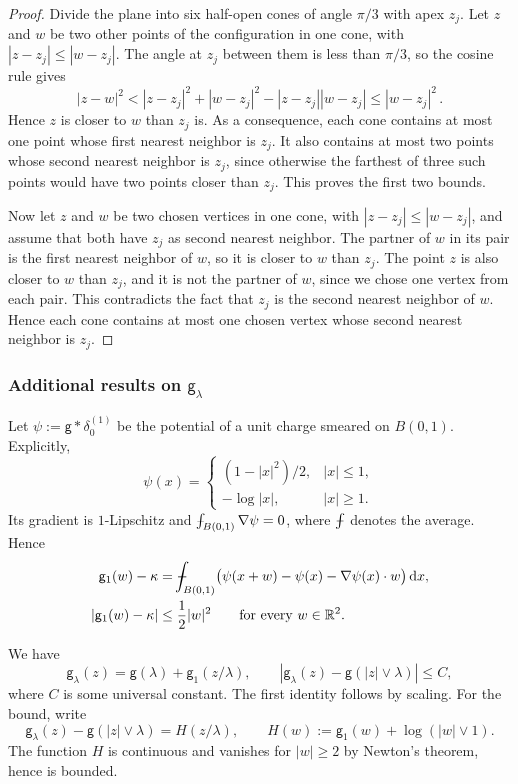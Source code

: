 \documentclass[a4paper,10pt,leqno]{amsart}
\numberwithin{equation}{section}
\newcommand{\R}{\mathbb{R}}
\newcommand{\dd}{\mathrm{d}}
\def\hal{\frac{1}{2}}
\def\nab{\nabla}
\def\Xint#1{\mathchoice
  {\XXint\displaystyle\textstyle{#1}}%
  {\XXint\textstyle\scriptstyle{#1}}%
  {\XXint\scriptstyle\scriptscriptstyle{#1}}%
  {\XXint\scriptscriptstyle\scriptscriptstyle{#1}}%
  \!\int}
\def\XXint#1#2#3{{\setbox0=\hbox{$#1{#2#3}{\int}$}
  \vcenter{\hbox{$#2#3$}}\kern-.5\wd0}}
\def\dashint{\Xint-}
\def\g{\mathsf{g}}
\begin{document}
\begin{proof}
  Divide the plane into six half-open cones of angle $\pi/3$ with apex $z_j$. Let $z$ and $w$ be two other points of the configuration in one cone, with $|z-z_j|\le|w-z_j|$. The angle at $z_j$ between them is less than $\pi/3$, so the cosine rule gives
  \[
    |z-w|^2<|z-z_j|^2+|w-z_j|^2-|z-z_j||w-z_j|\le|w-z_j|^2\,.
  \]
  Hence $z$ is closer to $w$ than $z_j$ is. As a consequence, each cone contains at most one point whose first nearest neighbor is $z_j$. It also contains at most two points whose second nearest neighbor is $z_j$, since otherwise the farthest of three such points would have two points closer than $z_j$. This proves the first two bounds.

  Now let $z$ and $w$ be two chosen vertices in one cone, with $|z-z_j|\le|w-z_j|$, and assume that both have $z_j$ as second nearest neighbor. The partner of $w$ in its pair is the first nearest neighbor of $w$, so it is closer to $w$ than $z_j$. The point $z$ is also closer to $w$ than $z_j$, and it is not the partner of $w$, since we chose one vertex from each pair. This contradicts the fact that $z_j$ is the second nearest neighbor of $w$. Hence each cone contains at most one chosen vertex whose second nearest neighbor is $z_j$.
\end{proof}

\subsubsection*{Additional results on $\g_\lambda$}
Let $\psi:=\g*\delta_0^{(1)}$ be the potential of a unit charge smeared on $B(0,1)$. Explicitly,
\[
  \psi(x)=
  \begin{cases}
    (1-|x|^2)/2,& |x|\le1,\\
    -\log|x|,& |x|\ge1.
  \end{cases}
\]
Its gradient is $1$-Lipschitz and $\dashint_{B(0,1)}\nab\psi=0$, where $\dashint$ denotes the average. Hence
\begin{equation}\label{idg1}
  \begin{aligned}
    \g_1(w)-\kappa
    &=\dashint_{B(0,1)}\bigl(\psi(x+w)-\psi(x)-\nab\psi(x)\cdot w\bigr)\,\dd x,\\
    |\g_1(w)-\kappa|&\le\hal|w|^2 \qquad\text{for every }w\in\R^2.
  \end{aligned}
\end{equation}

We have
\begin{equation}\label{approxgeta} \g_\lambda(z)= \g(\lambda)+ \g_1(z/\lambda), \qquad
  |\g_\lambda(z)-\g(|z|\vee \lambda) |\le C,\end{equation}
where $C$ is some universal constant.
The first identity follows by scaling. For the bound, write
\[
  \g_\lambda(z)-\g(|z|\vee\lambda)=H(z/\lambda),\qquad
  H(w):=\g_1(w)+\log(|w|\vee1).
\]
The function $H$ is continuous and vanishes for $|w|\ge2$ by Newton's theorem, hence is bounded.
\end{document}
